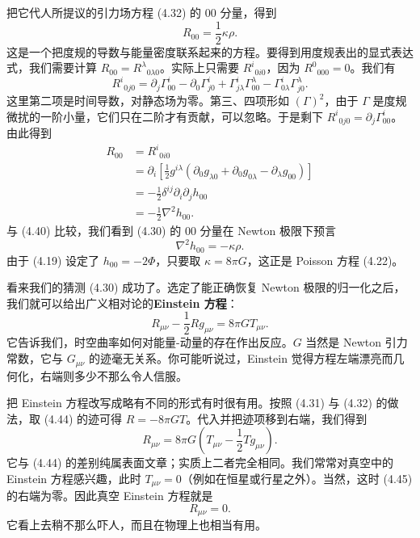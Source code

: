 把它代人所提议的引力场方程 (4.32) 的 00 分量，得到
\begin{equation*}
R_{00} = \frac{1}{2}\kappa\rho.
\tag{4.40}
\end{equation*}
这是一个把度规的导数与能量密度联系起来的方程。要得到用度规表出的显式表达式，我们需要计算 $R_{00}=R^\lambda{}_{0\lambda 0}$。实际上只需要 $R^i{}_{0i0}$，因为 $R^0{}_{000}=0$。我们有
\begin{equation*}
R^i{}_{0j0} = \partial_j\Gamma^i_{00} - \partial_0\Gamma^i_{j0} + \Gamma^i_{j\lambda}\Gamma^\lambda_{00} - \Gamma^i_{0\lambda}\Gamma^\lambda_{j0}.
\tag{4.41}
\end{equation*}
这里第二项是时间导数，对静态场为零。第三、四项形如 $(\Gamma)^2$，由于 $\Gamma$ 是度规微扰的一阶小量，它们只在二阶才有贡献，可以忽略。于是剩下 $R^i{}_{0j0}=\partial_j\Gamma^i_{00}$。由此得到
\begin{align*}
R_{00} &= R^i{}_{0i0} \\
&= \partial_i\left[\frac{1}{2}g^{i\lambda}\left(\partial_0 g_{\lambda 0} + \partial_0 g_{0\lambda} - \partial_\lambda g_{00}\right)\right] \\
&= -\frac{1}{2}\delta^{ij}\partial_i\partial_j h_{00} \\
&= -\frac{1}{2}\nabla^2 h_{00}.
\tag{4.42}
\end{align*}
与 (4.40) 比较，我们看到 (4.30) 的 00 分量在 Newton 极限下预言
\begin{equation*}
\nabla^2 h_{00} = -\kappa\rho.
\tag{4.43}
\end{equation*}
由于 (4.19) 设定了 $h_{00}=-2\Phi$，只要取 $\kappa=8\pi G$，这正是 Poisson 方程 (4.22)。

看来我们的猜测 (4.30) 成功了。选定了能正确恢复 Newton 极限的归一化之后，我们就可以给出广义相对论的\textbf{Einstein 方程}：
\begin{equation*}
\boxed{\,R_{\mu\nu} - \frac{1}{2}Rg_{\mu\nu} = 8\pi G T_{\mu\nu}.\,}
\tag{4.44}
\end{equation*}
它告诉我们，时空曲率如何对能量-动量的存在作出反应。$G$ 当然是 Newton 引力常数，它与 $G_{\mu\nu}$ 的迹毫无关系。你可能听说过，Einstein 觉得方程左端漂亮而几何化，右端则多少不那么令人信服。

把 Einstein 方程改写成略有不同的形式有时很有用。按照 (4.31) 与 (4.32) 的做法，取 (4.44) 的迹可得 $R=-8\pi GT$。代入并把迹项移到右端，我们得到
\begin{equation*}
\boxed{\,R_{\mu\nu} = 8\pi G\left(T_{\mu\nu} - \frac{1}{2}Tg_{\mu\nu}\right).\,}
\tag{4.45}
\end{equation*}
它与 (4.44) 的差别纯属表面文章；实质上二者完全相同。我们常常对真空中的 Einstein 方程感兴趣，此时 $T_{\mu\nu}=0$（例如在恒星或行星之外）。当然，这时 (4.45) 的右端为零。因此真空 Einstein 方程就是
\begin{equation*}
\boxed{\,R_{\mu\nu} = 0.\,}
\tag{4.46}
\end{equation*}
它看上去稍不那么吓人，而且在物理上也相当有用。

